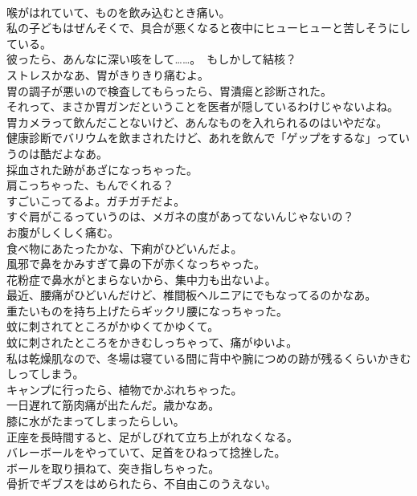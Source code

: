 \documentclass[8pt]{extreport}
\begin{document}
\begin{CJK}{UTF8}{min}
\\	喉がはれていて、ものを飲み込むとき痛い。	
\\	私の子どもはぜんそくで、具合が悪くなると夜中にヒューヒューと苦しそうにしている。	
\\	彼ったら、あんなに深い咳をして……。　もしかして結核？	
\\	ストレスかなあ、胃がきりきり痛むよ。	
\\	胃の調子が悪いので検査してもらったら、胃潰瘍と診断された。	
\\	それって、まさか胃ガンだということを医者が隠しているわけじゃないよね。	
\\	胃カメラって飲んだことないけど、あんなものを入れられるのはいやだな。	
\\	健康診断でバリウムを飲まされたけど、あれを飲んで「ゲップをするな」っていうのは酷だよなあ。	
\\	採血された跡があざになっちゃった。	
\\	肩こっちゃった、もんでくれる？	
\\	すごいこってるよ。ガチガチだよ。	
\\	すぐ肩がこるっていうのは、メガネの度があってないんじゃないの？	
\\	お腹がしくしく痛む。	
\\	食べ物にあたったかな、下痢がひどいんだよ。	
\\	風邪で鼻をかみすぎて鼻の下が赤くなっちゃった。	
\\	花粉症で鼻水がとまらないから、集中力も出ないよ。	
\\	最近、腰痛がひどいんだけど、椎間板ヘルニアにでもなってるのかなあ。	
\\	重たいものを持ち上げたらギックリ腰になっちゃった。	
\\	蚊に刺されてところがかゆくてかゆくて。	
\\	蚊に刺されたところをかきむしっちゃって、痛がゆいよ。	
\\	私は乾燥肌なので、冬場は寝ている間に背中や腕につめの跡が残るくらいかきむしってしまう。	
\\	キャンプに行ったら、植物でかぶれちゃった。	
\\	一日遅れて筋肉痛が出たんだ。歳かなあ。	
\\	膝に水がたまってしまったらしい。	
\\	正座を長時間すると、足がしびれて立ち上がれなくなる。	
\\	バレーボールをやっていて、足首をひねって捻挫した。	
\\	ボールを取り損ねて、突き指しちゃった。	
\\	骨折でギブスをはめられたら、不自由このうえない。	

\end{CJK}
\end{document}
